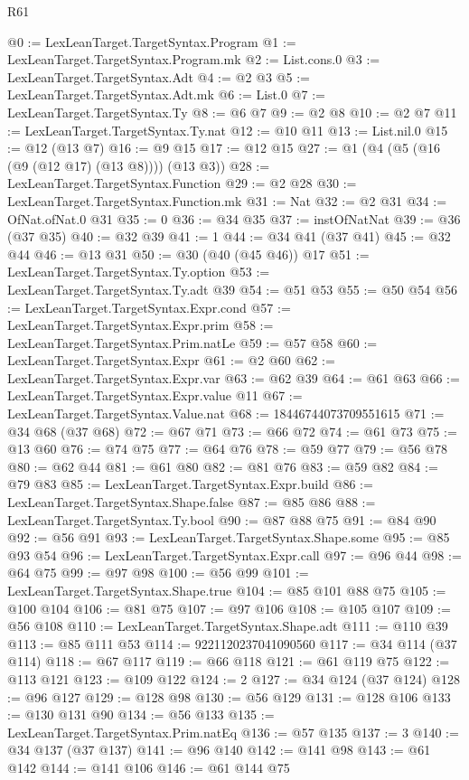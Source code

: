 \begin{lexlean}{R61}
\begin{coremodule}
@0 := LexLeanTarget.TargetSyntax.Program
@1 := LexLeanTarget.TargetSyntax.Program.mk
@2 := List.cons.{0}
@3 := LexLeanTarget.TargetSyntax.Adt
@4 := @2 @3
@5 := LexLeanTarget.TargetSyntax.Adt.mk
@6 := List.{0}
@7 := LexLeanTarget.TargetSyntax.Ty
@8 := @6 @7
@9 := @2 @8
@10 := @2 @7
@11 := LexLeanTarget.TargetSyntax.Ty.nat
@12 := @10 @11
@13 := List.nil.{0}
@15 := @12 (@13 @7)
@16 := @9 @15
@17 := @12 @15
@27 := @1 (@4 (@5 (@16 (@9 (@12 @17) (@13 @8)))) (@13 @3))
@28 := LexLeanTarget.TargetSyntax.Function
@29 := @2 @28
@30 := LexLeanTarget.TargetSyntax.Function.mk
@31 := Nat
@32 := @2 @31
@34 := OfNat.ofNat.{0} @31
@35 := 0
@36 := @34 @35
@37 := instOfNatNat
@39 := @36 (@37 @35)
@40 := @32 @39
@41 := 1
@44 := @34 @41 (@37 @41)
@45 := @32 @44
@46 := @13 @31
@50 := @30 (@40 (@45 @46)) @17
@51 := LexLeanTarget.TargetSyntax.Ty.option
@53 := LexLeanTarget.TargetSyntax.Ty.adt @39
@54 := @51 @53
@55 := @50 @54
@56 := LexLeanTarget.TargetSyntax.Expr.cond
@57 := LexLeanTarget.TargetSyntax.Expr.prim
@58 := LexLeanTarget.TargetSyntax.Prim.natLe
@59 := @57 @58
@60 := LexLeanTarget.TargetSyntax.Expr
@61 := @2 @60
@62 := LexLeanTarget.TargetSyntax.Expr.var
@63 := @62 @39
@64 := @61 @63
@66 := LexLeanTarget.TargetSyntax.Expr.value @11
@67 := LexLeanTarget.TargetSyntax.Value.nat
@68 := 18446744073709551615
@71 := @34 @68 (@37 @68)
@72 := @67 @71
@73 := @66 @72
@74 := @61 @73
@75 := @13 @60
@76 := @74 @75
@77 := @64 @76
@78 := @59 @77
@79 := @56 @78
@80 := @62 @44
@81 := @61 @80
@82 := @81 @76
@83 := @59 @82
@84 := @79 @83
@85 := LexLeanTarget.TargetSyntax.Expr.build
@86 := LexLeanTarget.TargetSyntax.Shape.false
@87 := @85 @86
@88 := LexLeanTarget.TargetSyntax.Ty.bool
@90 := @87 @88 @75
@91 := @84 @90
@92 := @56 @91
@93 := LexLeanTarget.TargetSyntax.Shape.some
@95 := @85 @93 @54
@96 := LexLeanTarget.TargetSyntax.Expr.call
@97 := @96 @44
@98 := @64 @75
@99 := @97 @98
@100 := @56 @99
@101 := LexLeanTarget.TargetSyntax.Shape.true
@104 := @85 @101 @88 @75
@105 := @100 @104
@106 := @81 @75
@107 := @97 @106
@108 := @105 @107
@109 := @56 @108
@110 := LexLeanTarget.TargetSyntax.Shape.adt
@111 := @110 @39
@113 := @85 @111 @53
@114 := 9221120237041090560
@117 := @34 @114 (@37 @114)
@118 := @67 @117
@119 := @66 @118
@121 := @61 @119 @75
@122 := @113 @121
@123 := @109 @122
@124 := 2
@127 := @34 @124 (@37 @124)
@128 := @96 @127
@129 := @128 @98
@130 := @56 @129
@131 := @128 @106
@133 := @130 @131 @90
@134 := @56 @133
@135 := LexLeanTarget.TargetSyntax.Prim.natEq
@136 := @57 @135
@137 := 3
@140 := @34 @137 (@37 @137)
@141 := @96 @140
@142 := @141 @98
@143 := @61 @142
@144 := @141 @106
@146 := @61 @144 @75

\end{coremodule}
\end{lexlean}
